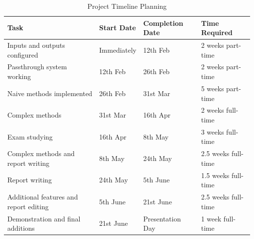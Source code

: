 \documentclass[12pt,a4paper]{report}
\begin{document}
\begin{table}[H]
\centering
\begin{tabular}{|l|l|l|l|}
\hline
\textbf{Task}                             & \textbf{Start Date} & \textbf{Completion Date}  & \textbf{Time Required} \\ \hline
Inputs and outputs configured             & Immediately         & 12th Feb                  & 2 weeks part-time \\
Passthrough system working                & 12th Feb            & 26th Feb                  & 2 weeks part-time \\
Naive methods implemented                 & 26th Feb            & 31st Mar                  & 5 weeks part-time \\
Complex methods                           & 31st Mar            & 16th Apr                  & 2 weeks full-time \\
Exam studying                             & 16th Apr            & 8th May                   & 3 weeks full-time \\
Complex methods and report writing        & 8th May             & 24th May                  & 2.5 weeks full-time \\
Report writing                            & 24th May            & 5th June                  & 1.5 weeks full-time \\
Additional features and report editing    & 5th June            & 21st June                 & 2.5 weeks full-time \\
Demonstration and final additions         & 21st June           & Presentation Day          & 1 week full-time \\ \hline
\end{tabular}
\caption{Project Timeline Planning}
\label{tbl:plan}
\end{table}
\end{document}
